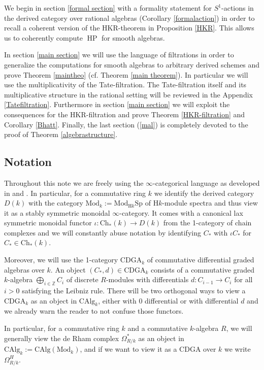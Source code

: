 \documentclass[10pt, reqno]{amsart}
\theoremstyle{definition}
\theoremstyle{remark}
\newcommand{\Z}{\mathbb{Z}}
\newcommand{\CAlg}{\mathrm{CAlg}}
\newcommand{\Sp}{\mathrm{Sp}}
\newcommand{\dr}[3]{\Omega^{#3}_{#1/#2}}
\newcommand{\Ch}{\mathrm{Ch}}
\newcommand{\Mod}{\mathrm{Mod}}
\renewcommand{\H}{\mathrm{H}}
\newcommand{\CDGA}{\mathrm{CDGA}}
\DeclareMathOperator{\HP}{\mathrm{HP}}
\begin{document}
We begin in section \ref{formal section} with a formality statement for $S^1$-actions in the derived category over rational algebras (Corollary \ref{formalaction}) in order to recall a coherent version of the HKR-theorem in Proposition \ref{HKR}. This allows us to coherently compute $\HP$ for smooth algebras.

In section \ref{main section} we will use the language of filtrations in order to generalize the computations for smooth algebras to arbitrary derived schemes and prove Theorem \ref{maintheo} (cf. Theorem \ref{main theorem}). In particular we will use the multiplicativity of the Tate-filtration. The Tate-filtration itself and its multiplicative structure in the rational setting will be reviewed in the Appendix \ref{Tatefiltration}. Furthermore in section \ref{main section} we will exploit the consequences for the HKR-filtration and prove Theorem \ref{HKR-filtration} and Corollary \ref{Bhatt}. Finally, the last section (\ref{mal}) is completely devoted to the proof of Theorem \ref{algebrastructure}.



\subsection{Notation}

Throughout this note we are freely using the $\infty$-categorical language as developed in \cite{Lur09} and \cite{Lur16}. In particular, for a commutative ring $k$ we identify the derived category $D(k)$ with the category $\Mod_k:=\Mod_{\H k}{\Sp}$ of $\H k$-module spectra and thus view it as a stably symmetric monoidal $\infty$-category. It comes with a canonical lax symmetric monoidal functor $\iota\colon \Ch_*(k)\to D(k)$ from the 1-category of chain complexes and we will constantly abuse notation by identifying $C_*$ with $\iota C_*$ for $C_*\in\Ch_*(k)$.

Moreover, we will use the 1-category $\CDGA_k$ of commutative differential graded algebras over $k$. An object $(C_*,d)\in \CDGA_k$ consists of a commutative graded $k$-algebra $\bigoplus_{i\in\Z} C_i$ of discrete $R$-modules with differentials $d\colon C_{i-1}\to C_{i}$ for all $i>0$ satisfying the Leibniz rule. There will be two orthogonal ways to view a $\CDGA_k$ as an object in $\CAlg_k$, either with 0 differential or with differential $d$ and we already warn the reader to not confuse those functors.

In particular, for a commutative ring $k$ and a commutative $k$-algebra $R$, we will generally view the de Rham complex $\dr Rk*$ as an object in $\CAlg_k:=\CAlg(\Mod_k)$, and if we want to view it as a CDGA over $k$ we write $\dr RkH$.
\end{document}
